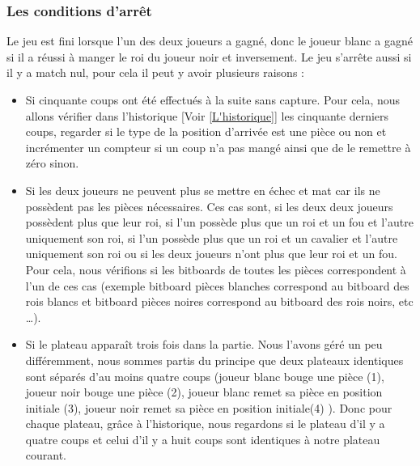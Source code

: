 \huge\documentclass{article}
\begin{document}
\subsubsection{Les conditions d'arrêt} \label{Architecture_condition_d'arrêt}
Le jeu est fini lorsque l'un des deux joueurs a gagné, donc le joueur blanc a gagné si il a réussi à manger le roi du joueur noir et inversement.\newline
Le jeu s'arrête aussi si il y a match nul, pour cela il peut y avoir plusieurs raisons :
\begin{itemize}
    \item Si cinquante coups ont été effectués à la suite sans capture.\newline
    Pour cela, nous allons vérifier dans l'historique [Voir \ref{L'historique}] les cinquante derniers coups, regarder si le type de la position d'arrivée est une pièce ou non et incrémenter un compteur si un coup n'a pas mangé ainsi que de le remettre à zéro sinon.
    \item Si les deux joueurs ne peuvent plus se mettre en échec et mat car ils ne possèdent pas les pièces nécessaires.\newline
    Ces cas sont, si les deux deux joueurs possèdent plus que leur roi, si l'un possède plus que un roi et un fou et l'autre uniquement son roi, si l'un possède plus que un roi et un cavalier et l'autre uniquement son roi ou si les deux joueurs n'ont plus que leur roi et un fou.\newline
    Pour cela, nous vérifions si les bitboards de toutes les pièces correspondent à l'un de ces cas (exemple bitboard pièces blanches correspond au bitboard des rois blancs et bitboard pièces noires correspond au bitboard des rois noirs, etc \dots).
    \item Si le plateau apparaît trois fois dans la partie.\newline
    Nous l'avons géré un peu différemment, nous sommes partis du principe que deux plateaux identiques sont séparés d'au moins quatre coups (joueur blanc bouge une pièce (1), joueur noir bouge une pièce (2), joueur blanc remet sa pièce en position initiale (3), joueur noir remet sa pièce en position initiale(4) ).\newline
    Donc pour chaque plateau, grâce à l'historique, nous regardons si le plateau d'il y a quatre coups et celui d'il y a huit coups sont identiques à notre plateau courant.
\end{itemize}
\end{document}
